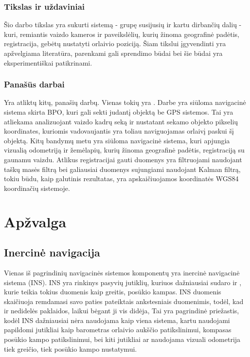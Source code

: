 \documentclass[a4paper,12pt]{article}
\begin{document}
		\subsubsection*{Tikslas ir uždaviniai}
		Šio darbo tikslas yra sukurti sistemą - grupę susijusių ir kartu dirbančių dalių - kuri, remiantis vaizdo kameros ir paveikslėlių, kurių žinoma geografinė padėtis, registracija, gebėtų nustatyti orlaivio poziciją.  		
		Šiam tikslui įgyvendinti yra apžvelgiama literatūra, parenkami gali sprendimo būdai bei šie būdai yra eksperimentiškai patikrinami. 
						
		\subsubsection*{Panašūs darbai}
		
		Yra atliktų kitų, panašių darbų. Vienas tokių yra \cite{VisualTrackingAndNavigation}. Darbe yra siūloma navigacinė sistema skirta BPO, kuri gali sekti judantį objektą be GPS sistemos. Tai yra atliekama analizuojant vaizdo kadrų seką ir nustatant sekamo objekto pikselių koordinates, kuriomis vadovaujantis yra toliau naviguojamas orlaivį paskui šį objektą. Kitų bandymų metu \cite{Con:2009:214103} yra siūloma navigacinė sistema, kuri apjungia vizualią odometriją ir žemėlapių, kurių žinoma geografinė padėtis, registraciją su gaunamu vaizdu. Atlikus registracijai gauti duomenys yra filtruojami naudojant taškų masės filtrą bei galiausiai duomenys sujungiami naudojant Kalman filtrą, tokiu būdu, kaip galutinis rezultatas, yra apskaičiuojamos koordinatės \gls{WGS84} koordinačių sistemoje. 
			 
 		\pagebreak	
\section{Apžvalga}		
	\subsection{Inercinė navigacija}
		\label{sec:InertionNavigation}
				
		Vienas iš pagrindinių navigacinės sistemos komponentų yra inercinė navigacinė sistema (INS). INS yra rinkinys pasyvių jutiklių, kuriuos dažniausiai sudaro  ir , kurie teikia tokius duomenis kaip greitis, posūkio kampas. INS duomenis skaičiuoja remdamasi savo paties pateiktais ankstesniais duomenimis, todėl, kad ir nedidelės paklaidos, laikui bėgant ji vis didėja, Tai yra pagrindinė priežastis, kodėl INS dažniausiai nėra naudojama kaip viena sistema, kartu naudojami papildomi jutikliai kaip barometras orlaivio aukščio patikslinimui, kompasas posūkio kampo patikslinimui, bei kiti jutikliai ar naudojama vizuali odometrija tiek greičio, tiek posūkio kampo nustatymui.	
			
\end{document}
